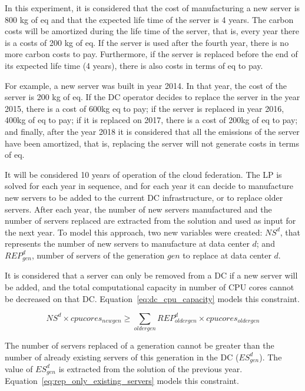 In this experiment, it is considered that the cost of manufacturing a new server is 800 kg of  eq and that the expected life time of the server is 4 years. The carbon costs will be amortized during the life time of the server, that is, every year there is a costs of 200 kg of  eq. If the server is used after the fourth year, there is no more carbon costs to pay. Furthermore, if the server is replaced before the end of its expected life time (4 years), there is also costs in terms of   eq to pay. 

For example, a new server was built in year 2014. In that year, the cost of the server is 200 kg of  eq. If the DC operator decides to replace the server in the year 2015, there is a cost of 600kg  eq to pay; if the server is replaced in year 2016, 400kg of  eq to pay; if it is replaced on 2017, there is a cost of 200kg of  eq to pay; and finally, after the year 2018 it is considered that all the emissions of the server have been amortized, that is, replacing the server will not generate costs in terms of  eq.


It will be considered 10 years of operation of the cloud federation. The LP is solved for each year in sequence, and for each year it can decide to manufacture new servers to be added to the current DC infrastructure, or to replace older servers. After each year, the number of new servers manufactured and the number of servers replaced are extracted from the solution and used as input for the next year. To model this approach, two new variables were created: $NS^d$, that represents the number of new servers to manufacture at data center $d$; and $REP_{gen}^d$, number of servers of the generation $gen$ to replace at data center $d$.


It is considered that a server can only be removed from a DC if a new server will be added, and the total computational capacity in number of CPU cores cannot be decreased on that DC. Equation~\eqref{eq:dc_cpu_capacity} models this constraint.

\begin{equation} \label{eq:dc_cpu_capacity}
 NS^d \times cpucores_{newgen} \geq \sum_{oldergen}  REP_{oldergen}^d \times cpucores_{oldergen}
\end{equation}


The number of servers replaced of a generation cannot be greater than the number of already existing servers of this generation in the DC ($ES_{gen}^d $). The value of  $ES_{gen}^d $ is extracted from the solution of the previous year. Equation~\eqref{eq:rep_only_existing_servers} models this constraint.

